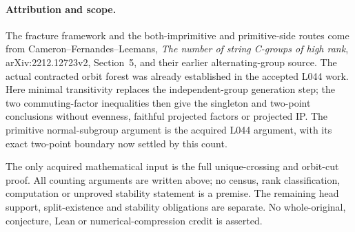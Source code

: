 \documentclass[11pt,a4paper]{article}
\begin{document}
\paragraph{Attribution and scope.}
The fracture framework and the both-imprimitive and primitive-side
routes come from Cameron--Fernandes--Leemans, \emph{The number of
string C-groups of high rank}, arXiv:2212.12723v2, Section~5,
and their earlier alternating-group source. The actual contracted
orbit forest was already established in the accepted L044 work.
Here minimal transitivity replaces the independent-group
generation step; the two commuting-factor inequalities then
give the singleton and two-point conclusions without evenness,
faithful projected factors or projected IP. The primitive
normal-subgroup argument is the acquired L044 argument, with
its exact two-point boundary now settled by this count.

The only acquired mathematical input is the full unique-crossing
and orbit-cut proof. All counting arguments are written above;
no census, rank classification, computation or unproved stability
statement is a premise. The remaining head support, split-existence
and stability obligations are separate. No whole-original,
conjecture, Lean or numerical-compression credit is asserted.
\end{document}
